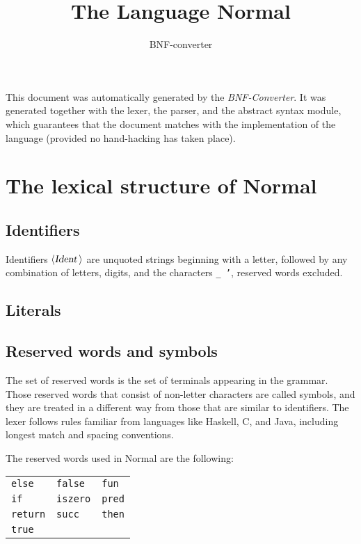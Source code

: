 \documentclass[a4paper,11pt]{article}
\title{The Language Normal}
\author{BNF-converter}
\begin{document}
\maketitle


\newcommand{\emptyP}{\mbox{$\epsilon$}}
\newcommand{\terminal}[1]{\mbox{{\texttt {#1}}}}
\newcommand{\nonterminal}[1]{\mbox{$\langle \mbox{{\sl #1 }} \! \rangle$}}
\newcommand{\arrow}{\mbox{::=}}
\newcommand{\delimit}{\mbox{$|$}}
\newcommand{\reserved}[1]{\mbox{{\texttt {#1}}}}
\newcommand{\literal}[1]{\mbox{{\texttt {#1}}}}
\newcommand{\symb}[1]{\mbox{{\texttt {#1}}}}

This document was automatically generated by the {\em BNF-Converter}.
It was generated together with the lexer, the parser, and the
abstract syntax module, which guarantees that the document
matches with the implementation of the language
(provided no hand-hacking has taken place).

\section*{The lexical structure of Normal}

\subsection*{Identifiers}
Identifiers \nonterminal{Ident} are unquoted strings beginning with a letter,
followed by any combination of letters, digits, and the characters {\tt \_ '},
reserved words excluded.
\subsection*{Literals}

\subsection*{Reserved words and symbols}
The set of reserved words is the set of terminals appearing in the grammar. Those reserved words that consist of non-letter characters are called symbols, and they are treated in a different way from those that are similar to identifiers. The lexer follows rules familiar from languages like Haskell, C, and Java, including longest match and spacing conventions.

The reserved words used in Normal are the following: \\

\begin{tabular}{lll}
{\reserved{else}} &{\reserved{false}} &{\reserved{fun}} \\
{\reserved{if}} &{\reserved{iszero}} &{\reserved{pred}} \\
{\reserved{return}} &{\reserved{succ}} &{\reserved{then}} \\
{\reserved{true}} & & \\
\end{tabular}\\
\end{document}
